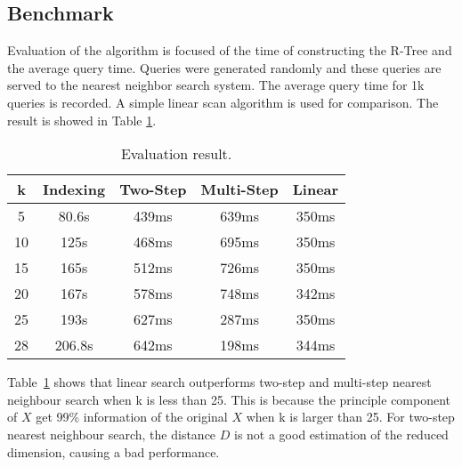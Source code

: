 \documentclass{article}
\begin{document}
\subsection{Benchmark}
Evaluation of the algorithm is focused of the time of constructing the R-Tree
and the average query time.
Queries were generated randomly and
these queries are served to the nearest neighbor search system.
The average
query time for 1k queries is recorded. A simple linear scan algorithm is
used for comparison. The result is showed in Table \ref{result}.

\begin{table}[tbh]
  \center
  \footnotesize
  \begin{tabular}{c|c|c|c|c}
    \textbf{k} & \textbf{Indexing} & \textbf{Two-Step} & \textbf{Multi-Step} & \textbf{Linear}\\
    \hline
    5 & 80.6s & 439ms & 639ms & 350ms\\
    \hline
    10 & 125s & 468ms & 695ms & 350ms \\
    \hline
    15 & 165s & 512ms & 726ms & 350ms \\
    \hline
    20 & 167s & 578ms & 748ms & 342ms \\
    \hline
    25 & 193s & 627ms & 287ms & 350ms \\
    \hline
    28 & 206.8s & 642ms & 198ms & 344ms \\
  \end{tabular}
  \caption{Evaluation result.}
  \label{result}
\end{table}

Table~\ref{result} shows that linear search outperforms two-step and multi-step
nearest neighbour search when k is less than 25. This is because the principle
component of $X$ get 99\% information of the original $X$ when k is larger than
25. For two-step nearest
neighbour search, the distance $D$ is not a good estimation of the reduced
dimension, causing a bad performance.
\end{document}
